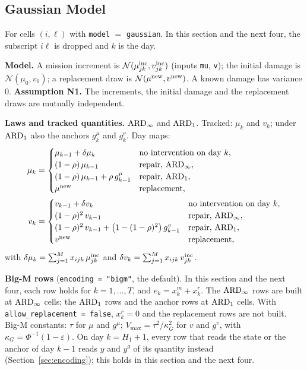 \subsection{Gaussian Model}
\label{sec:dyn_gaussian}

For cells $(i,\ell)$ with \texttt{model} $=$ \texttt{gaussian}. In this section and
the next four, the subscript $i\ell$ is dropped and $k$ is the day.

\textbf{Model.} A mission increment is $\mathcal{N}(\mu^{\mathrm{inc}}_{jk}, v^{\mathrm{inc}}_{jk})$
(inputs \texttt{mu}, \texttt{v}); the initial damage is $\mathcal{N}(\mu_0, v_0)$; a
replacement draw is $\mathcal{N}(\mu^{\mathrm{new}}, v^{\mathrm{new}})$. A known damage has variance 0.
\textbf{Assumption N1.} The increments, the initial damage and the replacement draws
are mutually independent.

\textbf{Laws and tracked quantities.} $\mathrm{ARD}_{\infty}$ and $\mathrm{ARD}_{1}$. Tracked: $\mu_k$ and
$v_k$; under $\mathrm{ARD}_{1}$ also the anchors $g^{\mu}_k$ and $g^{v}_k$. Day maps:
\begin{align}
  \mu_k &= \begin{cases}
    \mu_{k-1} + \delta\mu_k & \text{no intervention on day } k,\\
    (1-\rho)\,\mu_{k-1} & \text{repair, } \mathrm{ARD}_{\infty},\\
    (1-\rho)\,\mu_{k-1} + \rho\, g^{\mu}_{k-1} & \text{repair, } \mathrm{ARD}_{1},\\
    \mu^{\mathrm{new}} & \text{replacement,}
  \end{cases}
  \label{eq:g_map_mu} \\
  v_k &= \begin{cases}
    v_{k-1} + \delta v_k & \text{no intervention on day } k,\\
    (1-\rho)^2\, v_{k-1} & \text{repair, } \mathrm{ARD}_{\infty},\\
    (1-\rho)^2\, v_{k-1} + \bigl(1 - (1-\rho)^2\bigr)\, g^{v}_{k-1}
      & \text{repair, } \mathrm{ARD}_{1},\\
    v^{\mathrm{new}} & \text{replacement,}
  \end{cases}
  \label{eq:g_map_v}
\end{align}
with $\delta\mu_k = \sum_{j=1}^{M} x_{ijk}\,\mu^{\mathrm{inc}}_{jk}$ and
$\delta v_k = \sum_{j=1}^{M} x_{ijk}\,v^{\mathrm{inc}}_{jk}$.

\textbf{Big-M rows} (\texttt{encoding = "bigm"}, the default). In this section and
the next four, each row holds for $k = 1, \ldots, T$, and $e_k = x^m_k + x^r_k$. The
$\mathrm{ARD}_{\infty}$ rows are built at $\mathrm{ARD}_{\infty}$ cells; the $\mathrm{ARD}_{1}$ rows and the anchor rows at
$\mathrm{ARD}_{1}$ cells. With \texttt{allow\_replacement = false}, $x^r_k = 0$ and the
replacement rows are not built. Big-M constants: $\tau$ for $\mu$ and $g^{\mu}$;
$V_{\max} = \tau^2/\kappa_G^2$ for $v$ and $g^{v}$, with
$\kappa_G = \Phi^{-1}(1-\varepsilon)$. On day $k = H_1 + 1$, every row that reads the
state or the anchor of day $k-1$ reads $y$ and $y^{g}$ of its quantity instead
(Section~\ref{sec:encoding}); this holds in this section and the next four.

